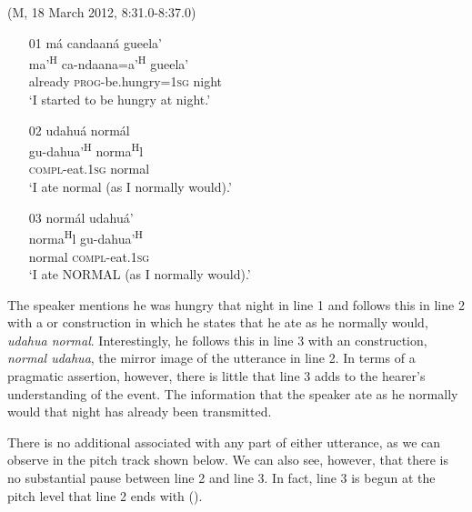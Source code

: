 \ea (M, 18 March 2012, 8:31.0-8:37.0)
\begin{itemize}

\item[01] 
\glll m\'{a} candaan\'{a} gueela'  \\
ma'\textsuperscript{H} ca-ndaana=a'\textsuperscript{H} gueela'  \\
already \textsc{prog}-be.hungry=\textsc{1sg} night  \\
\glt `I started to be hungry at night.'



\item[02] 
\glll udahu\'{a} norm\'{a}l  \\
 gu-dahua'\textsuperscript{H} norma\textsuperscript{H}l  \\
\textsc{compl}-eat.\textsc{1sg} normal  \\
\glt `I ate normal (as I normally would).'


\item[03] 
\glll norm\'{a}l udahu\'{a}'  \\
norma\textsuperscript{H}l gu-dahua'\textsuperscript{H}  \\
normal \textsc{compl}-eat.\textsc{1sg}  \\
\glt `I ate NORMAL (as I normally would).'

\end{itemize}
\z
The speaker mentions he was hungry that night in line 1 and follows this in line 2 with a  or  construction in which he states that he ate as he normally would, \textit{udahua normal}. Interestingly, he follows this in line 3 with an  construction, \textit{normal udahua}, the mirror image of the utterance in line 2. In terms of a pragmatic assertion, however, there is little that line 3 adds to the hearer's understanding of the event. The information that the speaker ate as he normally would that night has already been transmitted. 

There is no additional  associated with any part of either utterance, as we can observe in the pitch track shown below. We can also see, however, that there is no substantial pause between line 2 and line 3. In fact, line 3 is begun at the pitch level that line 2 ends with ().

